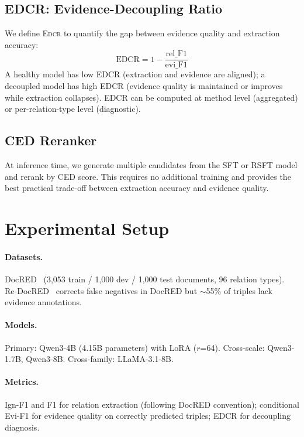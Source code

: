 \documentclass[11pt,a4paper]{article}
\newcommand{\edcr}{\textsc{Edcr}}
\begin{document}
\subsection{EDCR: Evidence-Decoupling Ratio}

We define \edcr{} to quantify the gap between evidence quality and extraction accuracy:
\begin{equation}
\text{EDCR} = 1 - \frac{\text{rel\_F1}}{\text{evi\_F1}}
\end{equation}
A healthy model has low EDCR (extraction and evidence are aligned); a decoupled model has high EDCR (evidence quality is maintained or improves while extraction collapses). EDCR can be computed at method level (aggregated) or per-relation-type level (diagnostic).

\subsection{CED Reranker}

At inference time, we generate multiple candidates from the SFT or RSFT model and rerank by CED score. This requires no additional training and provides the best practical trade-off between extraction accuracy and evidence quality.

\section{Experimental Setup}
\label{sec:setup}

\paragraph{Datasets.} DocRED~\cite{yao2019docred} (3,053 train / 1,000 dev / 1,000 test documents, 96 relation types). Re-DocRED~\cite{tan2022revisiting} corrects false negatives in DocRED but $\sim$55\% of triples lack evidence annotations.

\paragraph{Models.} Primary: Qwen3-4B (4.15B parameters) with LoRA ($r$=64). Cross-scale: Qwen3-1.7B, Qwen3-8B. Cross-family: LLaMA-3.1-8B.

\paragraph{Metrics.} Ign-F1 and F1 for relation extraction (following DocRED convention); conditional Evi-F1 for evidence quality on correctly predicted triples; EDCR for decoupling diagnosis.
\end{document}
